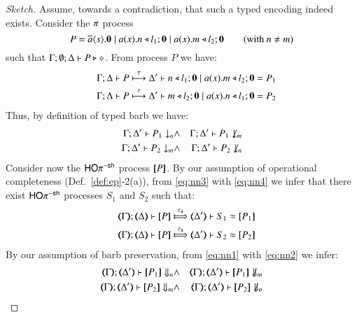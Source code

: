 \begin{proof}[Sketch]
	Assume, towards a contradiction, that such a typed encoding indeed exists. 
	Consider the $\pi$ process
	\[
		P = \overline{a} \langle s \rangle . \mathbf{0} \;|\; a (x) . n \triangleleft l_1 ; \mathbf{0} \;|\; a (x) . m \triangleleft l_2 ; \mathbf{0} \qquad \text{(with $n \neq m$)}
	\]
	\noi such that 
	$\Gamma; \emptyset; \Delta \vdash P \triangleright \diamond$.
	From process $P$ we have: %
	\begin{eqnarray}
		& & \Gamma; \Delta \vdash P \stackrel{\tau}{\longmapsto} \Delta' \vdash n \triangleleft l_1 ; \mathbf{0} \;|\; a (x) . m \triangleleft l_2 ; \mathbf{0} = P_1 \label{eq:nn3} \\
		& & \Gamma; \Delta \vdash P \stackrel{\tau}{\longmapsto} \Delta' \vdash m \triangleleft l_2 ; \mathbf{0} \;|\; a (x) . n \triangleleft l_1 ; \mathbf{0} = P_2 \label{eq:nn4}
	\end{eqnarray}
	Thus, by definition of typed barb we  have:
	\begin{eqnarray}
		\Gamma; \Delta' \vdash P_1 \downarrow_{n} & \land & 
		\Gamma; \Delta' \vdash P_1 \not\downarrow_{m} \label{eq:nn1} \\
		\Gamma; \Delta' \vdash P_2 \downarrow_{m} & \land & 
		\Gamma; \Delta' \vdash P_2 \not\downarrow_{n} \label{eq:nn2}
	\end{eqnarray}
	Consider now the $\mathsf{HO}\pi^{\mathsf{-sh}}$ process $[\!\![P]\!\!]$.
	By our assumption of operational completeness 
	(Def.~\ref{def:ep}-2(a)), 
	from \eqref{eq:nn3} with \eqref{eq:nn4}
	we infer that
	there exist $\mathsf{HO}\pi^{\mathsf{-sh}}$ processes $S_1$ and $S_2$ such that:
	\begin{eqnarray}
		& & \horel{\mapt{\Gamma}}{\mapt{\Delta}}{\map{P}}{\Hby{\stau}}{\mapt{\Delta'}}{S_1 \wb \map{P_1}} \label{eq:n1} \\
		& & \horel{\mapt{\Gamma}}{\mapt{\Delta}}{\map{P}}{\Hby{\stau}}{\mapt{\Delta'}}{S_2 \wb \map{P_2}} \label{eq:n2}
	\end{eqnarray}
	By our assumption of barb preservation, 
	from \eqref{eq:nn1} with \eqref{eq:nn2}
	we infer: 
	\begin{eqnarray}
		\mapt{\Gamma}; \mapt{\Delta'} \proves \map{P_1} \Barb{n} & \land & 
		\mapt{\Gamma}; \mapt{\Delta'} \proves \map{P_1} \nBarb{m} \label{eq:n3} \\
		\mapt{\Gamma}; \mapt{\Delta'} \proves \map{P_2} \Barb{m} & \land & 
		\mapt{\Gamma}; \mapt{\Delta'} \proves \map{P_2} \nBarb{n} \label{eq:n4}

\end{eqnarray}
\end{proof}
